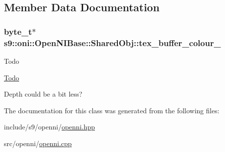 \subsection{\-Member \-Data \-Documentation}
\hypertarget{classs9_1_1oni_1_1OpenNIBase_1_1SharedObj_a95bcc43c79c432a446a88784ff5d1cc4}{
\subsubsection[{tex\-\_\-buffer\-\_\-colour\-\_\-}]{\setlength{\rightskip}{0pt plus 5cm}byte\-\_\-t$\ast$ {\bf s9\-::oni\-::\-Open\-N\-I\-Base\-::\-Shared\-Obj\-::tex\-\_\-buffer\-\_\-colour\-\_\-}}}\label{classs9_1_1oni_1_1OpenNIBase_1_1SharedObj_a95bcc43c79c432a446a88784ff5d1cc4}
\begin{DoxyRefDesc}{\-Todo}
\item[\hyperlink{todo__todo000021}{\-Todo}]
\begin{DoxyItemize}
\item \-Depth could be a bit less? 
\end{DoxyItemize}\end{DoxyRefDesc}


\-The documentation for this class was generated from the following files\-:\begin{DoxyCompactItemize}
\item 
include/s9/openni/\hyperlink{openni_8hpp}{openni.\-hpp}\item 
src/openni/\hyperlink{openni_8cpp}{openni.\-cpp}\end{DoxyCompactItemize}
